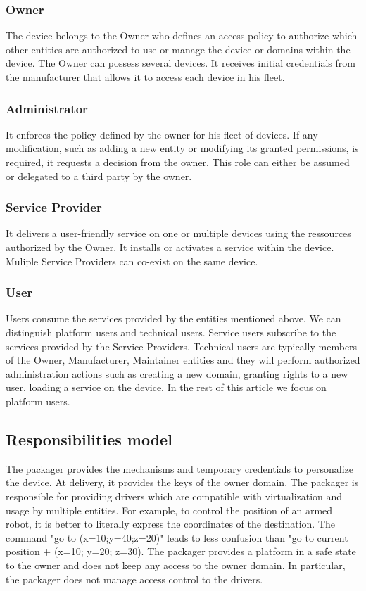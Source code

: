 \documentclass[conference]{IEEEtran}
\begin{document}
\subsubsection{Owner}
The device belongs to the Owner who defines an access policy to authorize which other entities are authorized to use or manage the device or domains within the device. The Owner can possess several devices. It receives initial credentials from the manufacturer that allows it to access each device in his fleet. 
\subsubsection{Administrator}
It enforces the policy defined by the owner for his fleet of devices. If any modification, such as adding a new entity or modifying its granted permissions,  is required, it requests a decision from the owner. This role can either be assumed or delegated to a third party by the owner. 
\subsubsection{Service Provider}
It delivers a user-friendly service on one or multiple devices using the ressources authorized by the Owner. It installs or activates a service within the device. Muliple Service Providers can co-exist on the same device. 
\subsubsection{User}
Users consume the services provided by the entities mentioned above. We can distinguish platform users and technical users. Service users subscribe to the services provided by the Service Providers. Technical users are typically members of the Owner, Manufacturer, Maintainer entities and they will perform authorized administration actions such as creating a new domain, granting rights to a new user, loading a service on the device. In the rest of this article we focus on platform users.
 
\subsection{Responsibilities model}
\label{sec:Resp_model}
The packager provides the mechanisms and temporary credentials to personalize the device. At delivery, it provides the keys of the owner domain. The packager is responsible for providing drivers which are compatible with virtualization and usage by multiple entities. For example, to control the position of an armed robot, it is better to literally express the coordinates of the destination. The command "go to (x=10;y=40;z=20)" leads to less confusion than "go to current position + (x=10; y=20; z=30). The packager provides a platform in a safe state to the owner and does not keep any access to the owner domain. In particular, the packager does not manage access control to the drivers.\\
\end{document}

